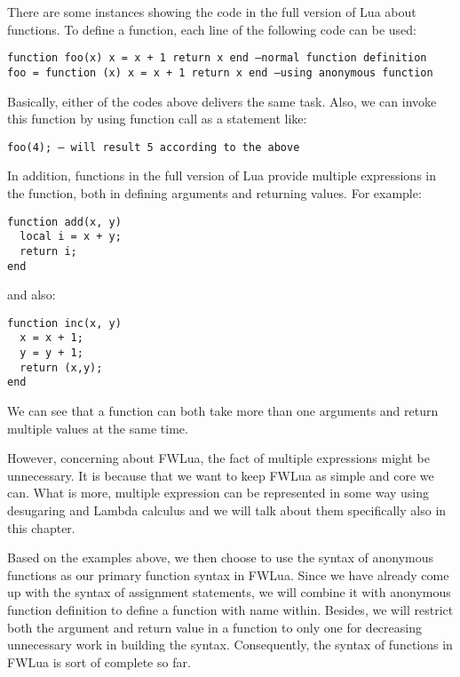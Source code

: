 There are some instances showing the code in the full version of Lua about functions. To define a function, each line of the following code can be used:
\begin{flushleft}
\tt function foo(x) x = x + 1 return x end --normal function definition\\
\tt foo = function (x) x = x + 1 return x end --using anonymous function\\
\end{flushleft}
Basically, either of the codes above delivers the same task. Also, we can invoke this function by using function call as a statement like:
\begin{flushleft}
\tt foo(4); -- will result 5 according to the above \\
\end{flushleft}
In addition, functions in the full version of Lua provide multiple expressions in the function, both in defining arguments and returning values. For example:
\begin{flushleft}
\tt function add(x, y) \\
\tt ~~local i = x + y;\\
\tt ~~return i;\\
\tt end\\
\end{flushleft}
and also:
\begin{flushleft}
\tt function inc(x, y) \\
\tt ~~x = x + 1;\\
\tt ~~y = y + 1;\\
\tt ~~return (x,y);\\
\tt end\\
\end{flushleft}
We can see that a function can both take more than one arguments and return multiple values at the same time.

However, concerning about FWLua, the fact of multiple expressions might be unnecessary. It is because that we want to keep FWLua as simple and core we can. What is more, multiple expression can be represented in some way using desugaring and Lambda calculus and we will talk about them specifically also in this chapter.

Based on the examples above, we then choose to use the syntax of anonymous functions as our primary function syntax in FWLua. Since we have already come up with the syntax of assignment statements, we will combine it with anonymous function definition to define a function with name within. Besides, we will restrict both the argument and return value in a function to only one for decreasing unnecessary work in building the syntax. Consequently, the syntax of functions in FWLua is sort of complete so far.

